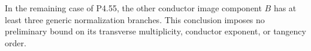 
\begin{proposition}[P4.56]\hypertarget{tag-02XV}{}\label{night:P4.56}\label{stmt:P4.56}


In the remaining case of P4.55, the other conductor image
component $B$ has at least three generic normalization
branches. This conclusion imposes no preliminary bound on
its transverse multiplicity, conductor exponent, or tangency
order.
\end{proposition}

